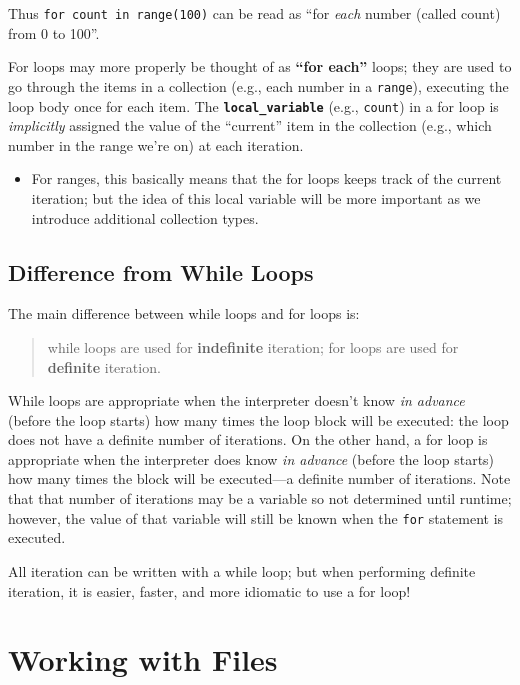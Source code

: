 \documentclass[]{book}
\providecommand{\tightlist}{%
  \setlength{\itemsep}{0pt}\setlength{\parskip}{0pt}}
\begin{document}
Thus \texttt{for\ count\ in\ range(100)} can be read as ``for
\emph{each} number (called count) from 0 to 100''.

For loops may more properly be thought of as \textbf{``for each''}
loops; they are used to go through the items in a collection (e.g., each
number in a \texttt{range}), executing the loop body once for each item.
The \textbf{\texttt{local\_variable}} (e.g., \texttt{count}) in a for
loop is \emph{implicitly} assigned the value of the ``current'' item in
the collection (e.g., which number in the range we're on) at each
iteration.

\begin{itemize}
\tightlist
\item
  For ranges, this basically means that the for loops keeps track of the
  current iteration; but the idea of this local variable will be more
  important as we introduce additional collection types.
\end{itemize}

\hypertarget{difference-from-while-loops}{\subsection{Difference from
While Loops}\label{difference-from-while-loops}}

The main difference between while loops and for loops is:

\begin{quote}
while loops are used for \textbf{indefinite} iteration; for loops are
used for \textbf{definite} iteration.
\end{quote}

While loops are appropriate when the interpreter doesn't know \emph{in
advance} (before the loop starts) how many times the loop block will be
executed: the loop does not have a definite number of iterations. On the
other hand, a for loop is appropriate when the interpreter does know
\emph{in advance} (before the loop starts) how many times the block will
be executed---a definite number of iterations. Note that that number of
iterations may be a variable so not determined until runtime; however,
the value of that variable will still be known when the \texttt{for}
statement is executed.

All iteration can be written with a while loop; but when performing
definite iteration, it is easier, faster, and more idiomatic to use a
for loop!

\hypertarget{working-with-files}{\section{Working with
Files}\label{working-with-files}}
\end{document}
